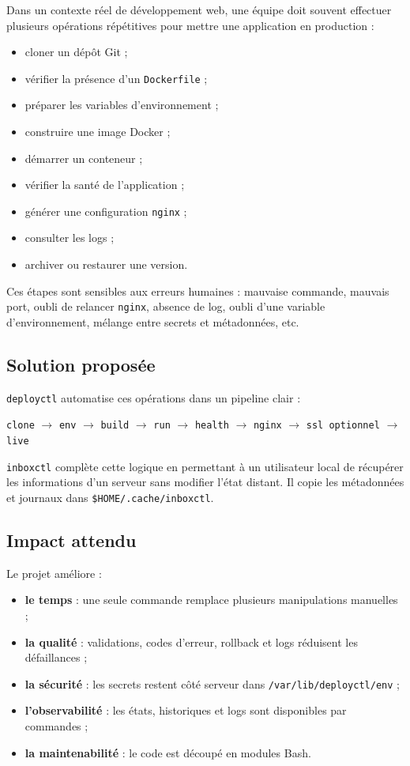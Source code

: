 \documentclass[12pt,a4paper]{article}
\begin{document}
Dans un contexte réel de développement web, une équipe doit souvent effectuer plusieurs opérations répétitives pour mettre une application en production :
\begin{itemize}[leftmargin=*]
  \item cloner un dépôt Git ;
  \item vérifier la présence d'un \texttt{Dockerfile} ;
  \item préparer les variables d'environnement ;
  \item construire une image Docker ;
  \item démarrer un conteneur ;
  \item vérifier la santé de l'application ;
  \item générer une configuration \texttt{nginx} ;
  \item consulter les logs ;
  \item archiver ou restaurer une version.
\end{itemize}

Ces étapes sont sensibles aux erreurs humaines : mauvaise commande, mauvais port, oubli de relancer \texttt{nginx}, absence de log, oubli d'une variable d'environnement, mélange entre secrets et métadonnées, etc.

\subsection{Solution proposée}

\texttt{deployctl} automatise ces opérations dans un pipeline clair :

\begin{center}
\texttt{clone} $\rightarrow$ \texttt{env} $\rightarrow$ \texttt{build} $\rightarrow$ \texttt{run} $\rightarrow$ \texttt{health} $\rightarrow$ \texttt{nginx} $\rightarrow$ \texttt{ssl optionnel} $\rightarrow$ \texttt{live}
\end{center}

\texttt{inboxctl} complète cette logique en permettant à un utilisateur local de récupérer les informations d'un serveur sans modifier l'état distant. Il copie les métadonnées et journaux dans \texttt{\$HOME/.cache/inboxctl}.

\subsection{Impact attendu}

Le projet améliore :
\begin{itemize}[leftmargin=*]
  \item \textbf{le temps} : une seule commande remplace plusieurs manipulations manuelles ;
  \item \textbf{la qualité} : validations, codes d'erreur, rollback et logs réduisent les défaillances ;
  \item \textbf{la sécurité} : les secrets restent côté serveur dans \texttt{/var/lib/deployctl/env} ;
  \item \textbf{l'observabilité} : les états, historiques et logs sont disponibles par commandes ;
  \item \textbf{la maintenabilité} : le code est découpé en modules Bash.
\end{itemize}
\end{document}

